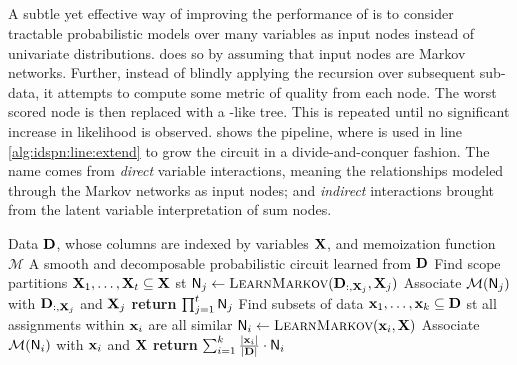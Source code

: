 \subsection{}

A subtle yet effective way of improving the performance of  is to consider
tractable probabilistic models over many variables as input nodes instead of univariate
distributions.  \citep{rooshenas14} does so by assuming that input nodes are
Markov networks. Further, instead of blindly applying the recursion over subsequent sub-data, it
attempts to compute some metric of quality from each node. The worst scored node is then replaced
with a -like tree. This is repeated until no significant increase in likelihood
is observed.  shows the  pipeline, where  is
used in line \ref{alg:idspn:line:extend} to grow the circuit in a divide-and-conquer fashion. The
name  comes from \emph{direct} variable interactions, meaning the relationships
modeled through the Markov networks as input nodes; and \emph{indirect} interactions brought from
the latent variable interpretation of sum nodes.

\begin{algorithm}[t]
  \caption{}\label{alg:extendid}
  \begin{algorithmic}[1]
    \Require Data $\mathbf{D}$, whose columns are indexed by variables $\mathbf{X}$, and memoization
      function $\mathcal{M}$
    \Ensure A smooth and decomposable probabilistic circuit learned from $\mathbf{D}$
    \State Find scope partitions $\mathbf{X}_1,\ldots,\mathbf{X}_t\subseteq\mathbf{X}$ st
        \State $\Node_j\gets\textproc{LearnMarkov}(\set{D}_{:,\set{X}_j},\set{X}_j)$
        \State Associate $\mathcal{M}(\operatorname{\textsf{N}}_j)$ with $\mathbf{D}_{:,\mathbf{X}_j}$ and $\mathbf{X}_j$
      \EndFor
      \State \textbf{return} $\prod_{j=1}^t \operatorname{\textsf{N}}_j$
    \Else
      \State Find subsets of data $\mathbf{x}_1,\ldots,\mathbf{x}_k\subseteq\mathbf{D}$ st all assignments
        within $\mathbf{x}_i$ are all similar
        \State $\Node_i\gets\textproc{LearnMarkov}(\set{x}_i,\set{X})$
        \State Associate $\mathcal{M}(\operatorname{\textsf{N}}_i)$ with $\mathbf{x}_i$ and $\mathbf{X}$
      \EndFor
      \State \textbf{return} $\sum_{i=1}^k \frac{|\mathbf{x}_i|}{|\mathbf{D}|}\cdot\operatorname{\textsf{N}}_i$
    \EndIf
  \end{algorithmic}
\end{algorithm}

